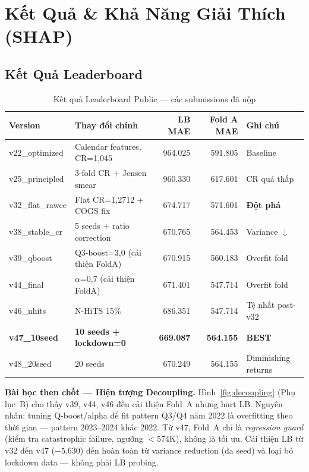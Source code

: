 \documentclass{article}
\begin{document}
\section{Kết Quả \& Khả Năng Giải Thích (SHAP)}

\subsection{Kết Quả Leaderboard}

\begin{table}[h!]
\centering
\caption{Kết quả Leaderboard Public — các submissions đã nộp}
\label{tab:lb}
\small
\begin{tabular}{llrrl}
\toprule
\textbf{Version} & \textbf{Thay đổi chính} & \textbf{LB MAE} & \textbf{Fold A MAE} & \textbf{Ghi chú} \\
\midrule
v22\_optimized  & Calendar features, CR=1,045    & 964.025   & 591.805 & Baseline \\
v25\_principled & 3-fold CR + Jensen smear        & 960.330   & 617.601 & CR quá thấp \\
v32\_flat\_rawcc & Flat CR=1,2712 + COGS fix      & 674.717   & 571.601 & \textbf{Đột phá} \\
v38\_stable\_cr & 5 seeds + ratio correction      & 670.765   & 564.453 & Variance $\downarrow$ \\
v39\_qboost     & Q3-boost=3,0 (cải thiện FoldA) & 670.915   & 560.183 & Overfit fold \\
v44\_final      & $\alpha$=0,7 (cải thiện FoldA) & 671.401   & 547.714 & Overfit fold \\
v46\_nhits      & N-HiTS 15\%                     & 686.351   & 547.714 & Tệ nhất post-v32 \\
\textbf{v47\_10seed} & \textbf{10 seeds + lockdown=0} & \textbf{669.087} & \textbf{564.155} & \textbf{BEST} \\
v48\_20seed     & 20 seeds                        & 670.249   & 564.155 & Diminishing returns \\
\bottomrule
\end{tabular}
\end{table}

\textbf{Bài học then chốt — Hiện tượng Decoupling.} Hình~\ref{fig:decoupling} (Phụ lục~B) cho thấy v39, v44, v46 đều cải thiện Fold~A nhưng hurt LB. Nguyên nhân: tuning Q-boost/alpha để fit pattern Q3/Q4 năm 2022 là overfitting theo thời gian — pattern 2023–2024 khác 2022. Từ v47, Fold~A chỉ là \textit{regression guard} (kiểm tra catastrophic failure, ngưỡng $< 574$K), không là tối ưu. Cải thiện LB từ v32 đến v47 ($-5.630$) đến hoàn toàn từ variance reduction (đa seed) và loại bỏ lockdown data — không phải LB probing.
\end{document}
